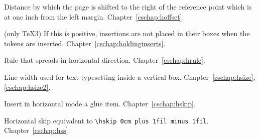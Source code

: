 \begin{glossinventory}
\item [\cs{hoffset}]
      Distance by which the page is shifted to the right 
      of the reference point which is at one inch from
      the left margin.
Chapter~\ref{cschap:hoffset}.

\item [\cs{holdinginserts}]
      (only \TeX3) 
      If this is positive, insertions are not placed in their boxes 
      when the  tokens are inserted.
Chapter~\ref{cschap:holdinginserts}.

\item [\cs{hrule}]
      Rule that spreads in horizontal direction.
Chapter~\ref{cschap:hrule}.

\item [\cs{hsize}]
      Line width used for text typesetting inside a vertical box.
Chapter~\ref{cschap:hsize},\ref{cschap:hsize2}.

\item [\cs{hskip\gr{glue}}] 
      Insert in horizontal mode a glue item.
Chapter~\ref{cschap:hskip}.

\item [\cs{hss}]
      Horizontal skip equivalent to \verb-\hskip 0cm plus 1fil minus 1fil-.
Chapter~\ref{cschap:hss}.


\end{glossinventory}

